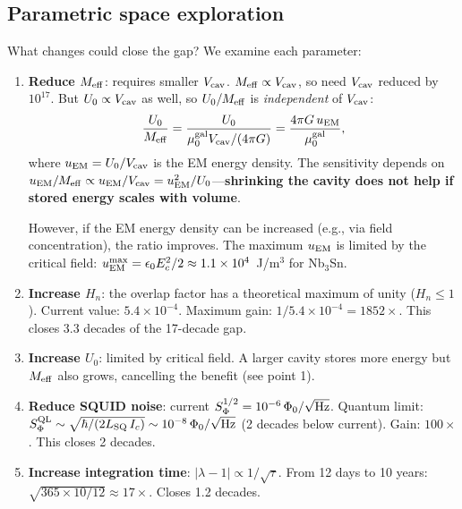 \documentclass[11pt,twocolumn]{article}
\newcommand{\lam}{\lambda}
\newcommand{\Meff}{M_{\rm eff}}
\newcommand{\ee}[1]{\times 10^{#1}}
\newcommand{\Heff}{H_n}
\newcommand{\Ucav}{U_0}
\newcommand{\Vcav}{V_{\rm cav}}
\newcommand{\muG}{\mu_0^{\rm gal}}
\theoremstyle{definition}
\theoremstyle{remark}
\begin{document}
\subsection{Parametric space exploration}
\label{sec:parameter_space}

What changes could close the gap? We examine each parameter:

\begin{enumerate}
\item \textbf{Reduce $\Meff$}: requires smaller $\Vcav$.
  $\Meff \propto \Vcav$, so need $\Vcav$ reduced by $10^{17}$.
  But $\Ucav \propto \Vcav$ as well, so $\Ucav/\Meff$ is
  \emph{independent} of $\Vcav$:
  \begin{equation}
  \frac{\Ucav}{\Meff} = \frac{U_0}{\muG\Vcav/(4\pi G)}
  = \frac{4\pi G\,u_{\rm EM}}{\muG},
  \label{eq:U_over_M}
  \end{equation}
  where $u_{\rm EM} = U_0/\Vcav$ is the EM energy density.
  The sensitivity depends on $u_{\rm EM}/\Meff \propto u_{\rm EM}/\Vcav
  = u_{\rm EM}^2/U_0$---\textbf{shrinking the cavity does not help
  if stored energy scales with volume}.

  However, if the EM energy density can be increased (e.g., via
  field concentration), the ratio improves. The maximum $u_{\rm EM}$
  is limited by the critical field: $u_{\rm EM}^{\rm max} = \epsilon_0 E_c^2/2
  \approx 1.1\ee{4}$~J/m$^3$ for Nb$_3$Sn.

\item \textbf{Increase $\Heff$}: the overlap factor has a theoretical maximum
  of unity ($\Heff \leq 1$). Current value: $5.4\ee{-4}$. Maximum gain:
  $1/5.4\ee{-4} = 1852\times$. This closes 3.3 decades of the 17-decade gap.

\item \textbf{Increase $\Ucav$}: limited by critical field. A larger cavity
  stores more energy but $\Meff$ also grows, cancelling the benefit
  (see point 1).

\item \textbf{Reduce SQUID noise}: current $S_\Phi^{1/2} = 10^{-6}\,
  \Phi_0/\sqrt{\rm Hz}$. Quantum limit:
  $S_\Phi^{\rm QL} \sim \sqrt{\hbar/(2L_{\rm SQ}\,I_c)} \sim 10^{-8}\,
  \Phi_0/\sqrt{\rm Hz}$ (2 decades below current). Gain: $100\times$.
  This closes 2 decades.

\item \textbf{Increase integration time}: $|\lam-1| \propto 1/\sqrt{\tau}$.
  From 12 days to 10 years: $\sqrt{365\times10/12} \approx 17\times$.
  Closes 1.2 decades.


\end{enumerate}
\end{document}
